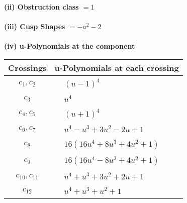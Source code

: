 \documentclass[1p]{elsarticle_modified}
\theoremstyle{definition}
\begin{document}
\flushleft \textbf{(ii) Obstruction class $= 1$}\\~\\
\flushleft \textbf{(iii) Cusp Shapes $= - a^2-2$}\\~\\
\newpage\renewcommand{\arraystretch}{1}
\flushleft \textbf{(iv) u-Polynomials at the component}\newline \\
\begin{tabular}{m{50pt}|m{274pt}}
Crossings & \hspace{64pt}u-Polynomials at each crossing \\
\hline $$\begin{aligned}c_{1},c_{2}\end{aligned}$$&$\begin{aligned}
&(u-1)^4
\end{aligned}$\\
\hline $$\begin{aligned}c_{3}\end{aligned}$$&$\begin{aligned}
&u^4
\end{aligned}$\\
\hline $$\begin{aligned}c_{4},c_{5}\end{aligned}$$&$\begin{aligned}
&(u+1)^4
\end{aligned}$\\
\hline $$\begin{aligned}c_{6},c_{7}\end{aligned}$$&$\begin{aligned}
&u^4- u^3+3 u^2-2 u+1
\end{aligned}$\\
\hline $$\begin{aligned}c_{8}\end{aligned}$$&$\begin{aligned}
&16(16 u^4+8 u^3+4 u^2+1)
\end{aligned}$\\
\hline $$\begin{aligned}c_{9}\end{aligned}$$&$\begin{aligned}
&16(16 u^4-8 u^3+4 u^2+1)
\end{aligned}$\\
\hline $$\begin{aligned}c_{10},c_{11}\end{aligned}$$&$\begin{aligned}
&u^4+u^3+3 u^2+2 u+1
\end{aligned}$\\
\hline $$\begin{aligned}c_{12}\end{aligned}$$&$\begin{aligned}
&u^4+u^3+u^2+1
\end{aligned}$\\
\hline
\end{tabular}\\~\\
\end{document}
